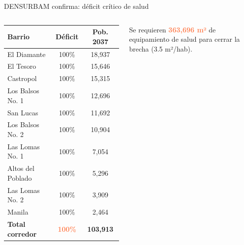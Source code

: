 \documentclass[aspectratio=169, 11pt]{beamer}
\newcommand{\danger}[1]{\textcolor{coral}{\textbf{#1}}}
\begin{document}
{\begin{frame}{DENSURBAM confirma: déficit crítico de salud}
\begin{columns}[T]
\vspace{4pt}
{\footnotesize
\begin{tabular}{@{}lcc@{}}
\toprule
\textbf{Barrio} & \textbf{Déficit} & \textbf{Pob. 2037} \\
\midrule
El Diamante & 100\% & 18,937 \\
El Tesoro & 100\% & 15,646 \\
Castropol & 100\% & 15,315 \\
Los Balsos No. 1 & 100\% & 12,696 \\
San Lucas & 100\% & 11,692 \\
Los Balsos No. 2 & 100\% & 10,904 \\
Las Lomas No. 1 & 100\% & 7,054 \\
Altos del Poblado & 100\% & 5,296 \\
Las Lomas No. 2 & 100\% & 3,909 \\
Manila & 100\% & 2,464 \\
\midrule
\textbf{Total corredor} & \danger{100\%} & \textbf{103,913} \\
\bottomrule
\end{tabular}
}

\vspace{4pt}
{\small Se requieren \danger{363,696 m²} de equipamiento de salud para cerrar la brecha (3.5 m²/hab).}
\end{columns}
\end{frame}
}
\end{document}
